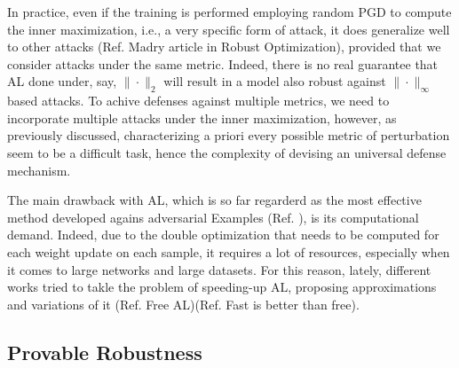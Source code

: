 \documentclass[LaM,binding=0.6cm]{./packages/sapthesis/sapthesis}
\begin{document}
                In practice, even if the training is performed employing random PGD to compute the inner maximization,
                i.e., a very specific form of attack, it does generalize well to other attacks (Ref. Madry article in Robust Optimization), 
                provided that we consider attacks under the same metric. Indeed, there is no real guarantee that AL
                done under, say, $\|\cdot\|_2$ will result in a model also robust against $\|\cdot\|_{\infty}$ based 
                attacks. To achive defenses against multiple metrics, we need to incorporate multiple attacks under the inner maximization,
                however, as previously discussed, characterizing a priori every possible metric of perturbation seem to be 
                a difficult task, hence the complexity of devising an universal defense mechanism.

                The main drawback with AL, which is so far regarderd as the most effective method developed agains adversarial
                Examples (Ref. ), is its computational demand. Indeed, due to the double optimization that needs to be
                computed for each weight update on each sample, it requires a lot of resources, especially when it comes
                to large networks and large datasets. For this reason, lately, different works tried to takle the
                problem of speeding-up AL, proposing approximations and variations of it (Ref. Free AL)(Ref. Fast is better than free).

                
            
            \subsection{Provable Robustness}
\end{document}
